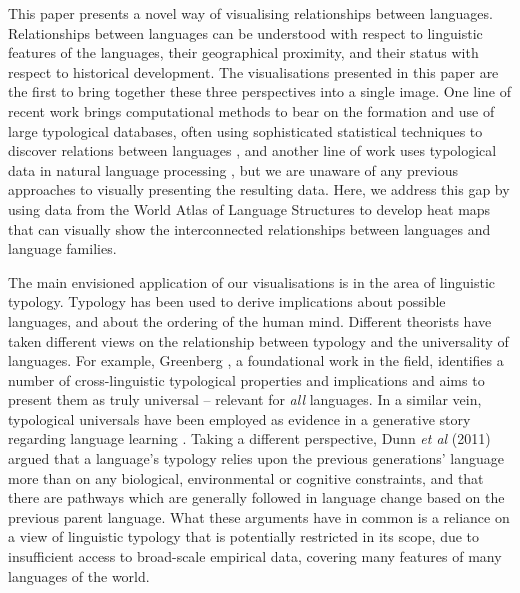 \documentclass[11pt]{article}
\begin{document}
This paper presents a novel way of visualising relationships between languages. Relationships between languages can be understood with respect to linguistic features of the languages, their geographical proximity, and their status with respect to historical development. The visualisations presented in this paper are the first to bring together these three perspectives into a single image. One line of recent work brings computational methods to bear on the formation and use of large typological databases, often using sophisticated statistical techniques to discover relations between languages \cite[among others]{cysouw2011,daume07implication,daume09areal}, and another line of work uses typological data in natural language processing \cite[for example]{georgi:etal:10,lewis:xia:08}, but we are unaware of any previous approaches to visually presenting the resulting data.
Here, we address this gap by using data from the World Atlas of Language Structures \cite{wals-2011} to develop heat maps that can visually show the interconnected relationships between languages and language families. 

The main envisioned application of our visualisations is in the area of linguistic typology. Typology has been used to derive implications about possible languages, and about the ordering of the human mind. Different theorists have taken different views on the relationship between typology and the universality of languages. For example, Greenberg , a foundational work in the field, identifies a number of cross-linguistic typological properties and implications and aims to present them as truly universal -- relevant for \textit{all} languages. In a similar vein, typological universals have been employed as evidence in a generative story regarding language learning \cite{chomsky}.
Taking a different perspective, Dunn {\it et al} (2011) %
argued that a language's typology relies upon the previous generations' language more than on any biological, environmental or cognitive constraints, and that there are pathways which are generally followed in language change based on the previous parent language. What these arguments have in common is a reliance on a view of linguistic typology that is potentially restricted in its scope, due to insufficient access to broad-scale empirical data, covering many features of many languages of the world. 
\end{document}
